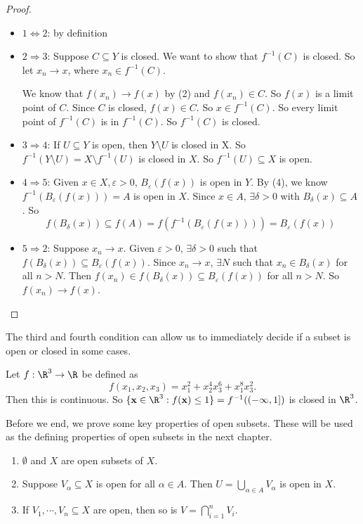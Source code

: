 \documentclass[a4paper]{article}
\begin{document}
\begin{proof}\leavevmode
  \begin{itemize}
    \item $1 \Leftrightarrow 2$: by definition
    \item $2 \Rightarrow 3$: Suppose $C\subseteq Y$ is closed. We want to show that $f^{-1}(C)$ is closed. So let $x_n \to x$, where $x_n \in f^{-1}(C)$.

      We know that $f(x_n) \to f(x)$ by (2) and $f(x_n) \in C$. So $f(x)$ is a limit point of $C$. Since $C$ is closed, $f(x) \in C$. So $x\in f^{-1}(C)$. So every limit point of $f^{-1}(C)$ is in $f^{-1}(C)$. So $f^{-1}(C)$ is closed.
    \item $3 \Rightarrow 4$: If $U\subseteq Y$ is open, then $Y\setminus U$ is closed in X. So $f^{-1}(Y\setminus U) = X\setminus f^{-1}(U)$ is closed in $X$. So $f^{-1}(U)\subseteq X$ is open.

    \item $4 \Rightarrow 5$: Given $x\in X, \varepsilon > 0$, $B_\varepsilon(f(x))$ is open in $Y$. By (4), we know $f^{-1}(B_\varepsilon(f(x))) = A$ is open in $X$. Since $x\in A$, $\exists \delta > 0$ with $B_\delta (x) \subseteq A$. So
      \[
        f(B_\delta(x)) \subseteq f(A) = f(f^{-1}(B_\varepsilon (f(x)))) = B_\varepsilon (f(x))
      \]
    \item $5 \Rightarrow 2$: Suppose $x_n \to x$. Given $\varepsilon > 0$, $\exists \delta > 0$ such that $f(B_\delta(x)) \subseteq B_\varepsilon(f(x))$. Since $x_n \to x$, $\exists N$ such that $x_n \in B_\delta (x)$ for all $n > N$. Then $f(x_n) \in f(B_\delta(x))\subseteq B_\varepsilon(f(x))$ for all $n > N$. So $f(x_n) \to f(x)$.
  \end{itemize}
\end{proof}

The third and fourth condition can allow us to immediately decide if a subset is open or closed in some cases.

\begin{eg}
  Let $f: \R^3 \to \R$ be defined as
  \[
    f(x_1, x_2, x_3) = x_1^2 + x_2^4 x_3^6 + x_1^8 x_3^2.
  \]
  Then this is continuous. So $\{\mathbf{x}\in \R^3: f(\mathbf{x}) \leq 1\} = f^{-1}((-\infty, 1])$ is closed in $\R^3$.
\end{eg}

Before we end, we prove some key properties of open subsets. These will be used as the defining properties of open subsets in the next chapter.
\begin{lemma}\leavevmode
  \begin{enumerate}
    \item $\emptyset$ and $X$ are open subsets of $X$.
    \item Suppose $V_\alpha \subseteq X$ is open for all $\alpha \in A$. Then $\displaystyle U = \bigcup_{\alpha \in A}V_\alpha$ is open in $X$.
    \item If $V_1, \cdots, V_n\subseteq X$ are open, then so is $\displaystyle V = \bigcap_{i = 1}^n V_i$.
  \end{enumerate}
\end{lemma}
\end{document}
